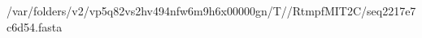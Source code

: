 \documentclass[10pt]{article}
\begin{document}
\begin{texshade}{/var/folders/v2/vp5q82vs2hv494nfw6m9h6x00000gn/T//RtmpfMIT2C/seq2217e7c6d54.fasta}
\hideconsensus
{}
\hidelogoscale
{}
\showlegend
\end{texshade}
\end{document}
